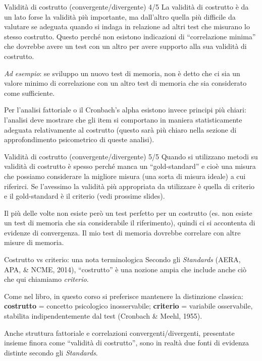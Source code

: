 \documentclass[
  ignorenonframetext,
]{beamer}
\begin{document}
\begin{frame}{Validità di costrutto (convergente/divergente) 4/5}
\label{validituxe0-di-costrutto-convergentedivergente-45}
La validità di costrutto è da un lato forse la validità più importante,
ma dall'altro quella più difficile da valutare se adeguata quando si
indaga in relazione ad altri test che misurano lo stesso costrutto.
Questo perché non esistono indicazioni di ``correlazione minima'' che
dovrebbe avere un test con un altro per avere supporto alla sua validità
di costrutto.

\emph{Ad esempio}: se sviluppo un nuovo test di memoria, non è detto che
ci sia un valore minimo di correlazione con un altro test di memoria che
sia considerato come sufficiente.

Per l'analisi fattoriale o il Cronbach's alpha esistono invece principi
più chiari: l'analisi deve mostrare che gli item si comportano in
maniera statisticamente adeguata relativamente al costrutto (questo sarà
più chiaro nella sezione di approfondimento psicometrico di queste
analisi).
\end{frame}

\begin{frame}{Validità di costrutto (convergente/divergente) 5/5}
\label{validituxe0-di-costrutto-convergentedivergente-55}
Quando si utilizzano metodi su validità di costrutto è spesso perché
manca un ``gold-standard'' e cioè una misura che possiamo considerare la
migliore misura (una sorta di misura ideale) a cui riferirci. Se
l'avessimo la validità più appropriata da utilizzare è quella di
criterio e il gold-standard è il criterio (vedi prossime slides).

Il più delle volte non esiste però un test perfetto per un costrutto
(es. non esiste un test di memoria che sia considerabile il
riferimento), quindi ci si accontenta di evidenze di convergenza. Il mio
test di memoria dovrebbe correlare con altre misure di memoria.
\end{frame}

\begin{frame}{Costrutto vs criterio: una nota terminologica}
\label{costrutto-vs-criterio-una-nota-terminologica}
Secondo gli \emph{Standards} (AERA, APA, \& NCME, 2014), ``costrutto'' è
una nozione ampia che include anche ciò che qui chiamiamo
\emph{criterio}.

Come nel libro, in questo corso si preferisce mantenere la distinzione
classica: \textbf{costrutto} = concetto psicologico inosservabile;
\textbf{criterio} = variabile osservabile, stabilita indipendentemente
dal test (Cronbach \& Meehl, 1955).

\vfill

Anche struttura fattoriale e correlazioni convergenti/divergenti,
presentate insieme finora come ``validità di costrutto'', sono in realtà
due fonti di evidenza distinte secondo gli \emph{Standards}.
\end{frame}
\end{document}
